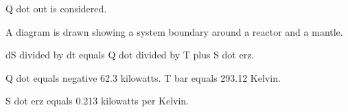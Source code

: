 Q dot out is considered.  

A diagram is drawn showing a system boundary around a reactor and a mantle.  

dS divided by dt equals Q dot divided by T plus S dot erz.  

Q dot equals negative 62.3 kilowatts.  
T bar equals 293.12 Kelvin.  

S dot erz equals 0.213 kilowatts per Kelvin.